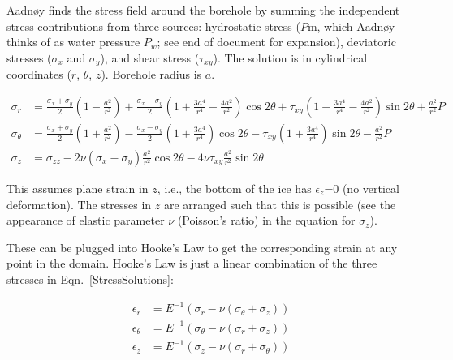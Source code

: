 \documentclass[11pt]{article}
\begin{document}
Aadn\o{}y finds the stress field around the borehole by summing the independent stress contributions from three sources: hydrostatic stress ($P$m, which Aadn\o{}y thinks of as water pressure $P_w$; see end of document for expansion), deviatoric stresses ($\sigma_x$ and $\sigma_y$), and shear stress ($\tau_{xy}$).  The solution is in cylindrical coordinates ($r$, $\theta$, $z$).  Borehole radius is $a$.  

\begin{equation}
	\begin{aligned}
	\sigma_r &= \frac{\sigma_x+\sigma_y}{2}\left(1-\frac{a^2}{r^2}\right) + \frac{\sigma_x-\sigma_y}{2}\left(1+\frac{3a^4}{r^4}-\frac{4a^2}{r^2}\right) \cos2\theta + \tau_{xy}\left(1+\frac{3a^4}{r^4}-\frac{4a^2}{r^2}\right)\sin2\theta + \frac{a^2}{r^2}P \\
	\sigma_\theta &= \frac{\sigma_x+\sigma_y}{2}\left(1+\frac{a^2}{r^2}\right) - \frac{\sigma_x-\sigma_y}{2}\left(1+\frac{3a^4}{r^4}\right) \cos2\theta - \tau_{xy}\left(1+\frac{3a^4}{r^4}\right)\sin2\theta - \frac{a^2}{r^2}P \\
	\sigma_z &= \sigma_{zz} -2\nu\left(\sigma_x-\sigma_y\right)\frac{a^2}{r^2}\cos2\theta - 4\nu\tau_{xy}\frac{a^2}{r^2}\sin2\theta
	\end{aligned}
\label{StressSolutions}
\end{equation}

\noindent This assumes plane strain in $z$, i.e., the bottom of the ice has $\epsilon_z$=0 (no vertical deformation).  The stresses in $z$ are arranged such that this is possible (see the appearance of elastic parameter $\nu$ (Poisson's ratio) in the equation for $\sigma_z$).

These can be plugged into Hooke's Law to get the corresponding strain at any point in the domain.  Hooke's Law is just a linear combination of the three stresses in Eqn.~\ref{StressSolutions}:

\begin{equation}
	\begin{aligned}
	\epsilon_r &= E^{-1}\left(\sigma_r - \nu \left(\sigma_\theta + \sigma_z \right)\right) \\
	\epsilon_\theta &= E^{-1}\left(\sigma_\theta - \nu \left(\sigma_r + \sigma_z \right)\right) \\
	\epsilon_z &= E^{-1}\left(\sigma_z - \nu \left(\sigma_r + \sigma_\theta \right)\right)
	\end{aligned}
\label{Hooke}
\end{equation}
\end{document}
